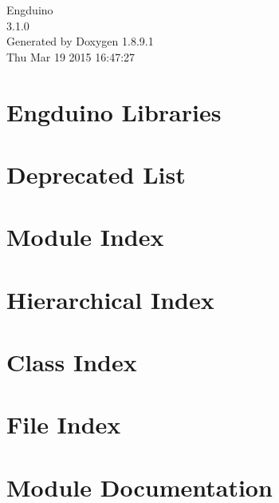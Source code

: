 \documentclass[twoside]{book}
\newcommand{\+}{\discretionary{\mbox{\scriptsize$\hookleftarrow$}}{}{}}
\newcommand{\clearemptydoublepage}{%
  \newpage{\pagestyle{empty}\cleardoublepage}%
}
\begin{document}
\hypersetup{pageanchor=false,
             bookmarks=true,
             bookmarksnumbered=true,
             pdfencoding=unicode
            }
\begin{titlepage}
\vspace*{7cm}
\begin{center}%
{\Large Engduino \\[1ex]\large 3.\+1.\+0 }\\
\vspace*{1cm}
{\large Generated by Doxygen 1.8.9.1}\\
\vspace*{0.5cm}
{\small Thu Mar 19 2015 16:47:27}\\
\end{center}
\end{titlepage}
\clearemptydoublepage
\tableofcontents
\clearemptydoublepage
{}
\hypersetup{pageanchor=true}

\chapter{Engduino Libraries}
\label{index}\hypertarget{index}{}
\chapter{Deprecated List}
\label{deprecated}
\hypertarget{deprecated}{}

\chapter{Module Index}

\chapter{Hierarchical Index}

\chapter{Class Index}

\chapter{File Index}

\chapter{Module Documentation}









\end{document}
